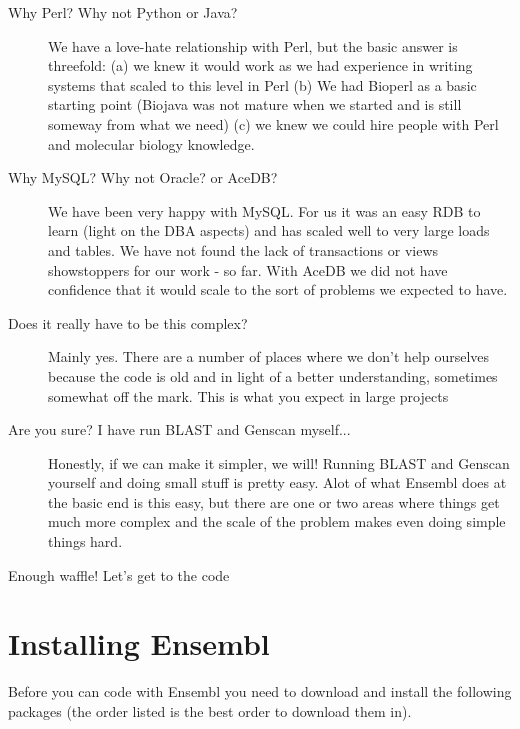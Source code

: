 \documentclass[11pt,a4paper]{article}
\begin{document}
\begin{description}

\item[Why Perl? Why not Python or Java?] We have a love-hate
relationship with Perl, but the basic answer is threefold: (a) we knew
it would work as we had experience in writing systems that scaled to
this level in Perl (b) We had Bioperl as a basic starting point
(Biojava was not mature when we started and is still someway from what
we need) (c) we knew we could hire people with Perl and molecular
biology knowledge.

\item[Why MySQL? Why not Oracle? or AceDB?] We have been very happy
with MySQL.  For us it was an easy RDB to learn (light on the DBA
aspects) and has scaled well to very large loads and tables. We have
not found the lack of transactions or views showstoppers for our work
- so far. With AceDB we did not have confidence that it would scale to
the sort of problems we expected to have.

\item[Does it really have to be this complex?] Mainly yes. There are a
number of places where we don't help ourselves because the code is old
and in light of a better understanding, sometimes somewhat off the
mark. This is what you expect in large projects

\item[Are you sure? I have run BLAST and Genscan myself...] Honestly,
if we can make it simpler, we will! Running BLAST and Genscan yourself
and doing small stuff is pretty easy. Alot of what Ensembl does at the
basic end is this easy, but there are one or two areas where things
get much more complex and the scale of the problem makes even doing
simple things hard.

\end{description}

Enough waffle! Let's get to the code

\section{Installing Ensembl}

Before you can code with Ensembl you need to download and install the
following packages (the order listed is the best order to download them in).
\end{document}
